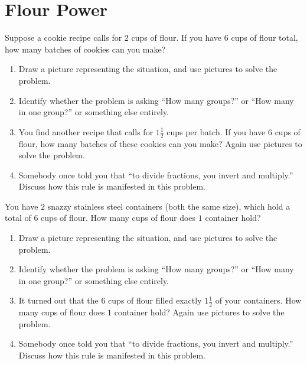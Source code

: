 \newpage
\section{Flour Power}\label{A:FlourPower}

\begin{prob} 
Suppose a cookie recipe calls for $2$ cups of flour. If you have $6$
cups of flour total, how many batches of cookies can you make?
\begin{enumerate}
\item Draw a picture representing the situation, and use pictures to solve the problem.
\item Identify whether the problem is asking ``How many groups?'' or ``How many in one group?'' or something else entirely.
\item You find another recipe that calls for $1\frac{1}{2}$ cups per batch. If you have $6$ cups of flour, how many batches of these cookies can you make?  Again use pictures to solve the problem.
\item Somebody once told you that ``to divide fractions, you invert and
multiply.'' Discuss how this rule is manifested in this problem.
\end{enumerate}
\end{prob}

\begin{prob} 
You have $2$ snazzy stainless steel containers (both the same size), which hold a total of
$6$ cups of flour. How many cups of flour does $1$ container hold?
\begin{enumerate}
\item Draw a picture representing the situation, and use pictures to solve the problem.
\item Identify whether the problem is asking ``How many groups?'' or ``How many in one group?'' or something else entirely.
\item It turned out that the 6 cups of flour filled exactly $1\frac{1}{2}$ of your containers.  How many cups of flour does $1$ container hold?  Again use pictures to solve the problem.
\item Somebody once told you that ``to divide fractions, you invert and
multiply.'' Discuss how this rule is manifested in this problem.
\end{enumerate}
\end{prob}


%
